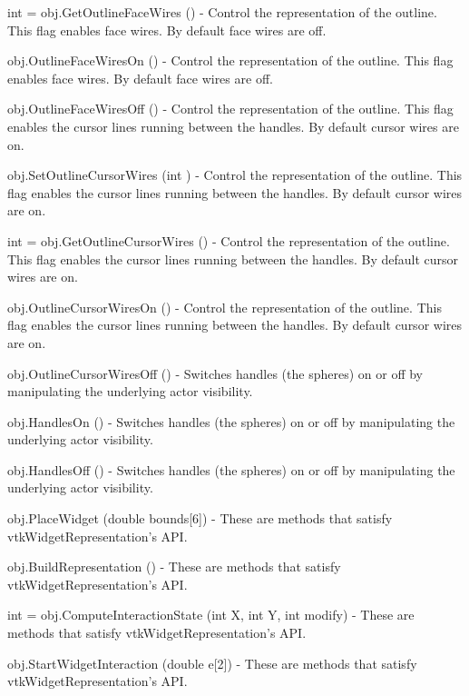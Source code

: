 \begin{DoxyItemize}
\item {\ttfamily int = obj.\-Get\-Outline\-Face\-Wires ()} -\/ Control the representation of the outline. This flag enables face wires. By default face wires are off.  
\item {\ttfamily obj.\-Outline\-Face\-Wires\-On ()} -\/ Control the representation of the outline. This flag enables face wires. By default face wires are off.  
\item {\ttfamily obj.\-Outline\-Face\-Wires\-Off ()} -\/ Control the representation of the outline. This flag enables the cursor lines running between the handles. By default cursor wires are on.  
\item {\ttfamily obj.\-Set\-Outline\-Cursor\-Wires (int )} -\/ Control the representation of the outline. This flag enables the cursor lines running between the handles. By default cursor wires are on.  
\item {\ttfamily int = obj.\-Get\-Outline\-Cursor\-Wires ()} -\/ Control the representation of the outline. This flag enables the cursor lines running between the handles. By default cursor wires are on.  
\item {\ttfamily obj.\-Outline\-Cursor\-Wires\-On ()} -\/ Control the representation of the outline. This flag enables the cursor lines running between the handles. By default cursor wires are on.  
\item {\ttfamily obj.\-Outline\-Cursor\-Wires\-Off ()} -\/ Switches handles (the spheres) on or off by manipulating the underlying actor visibility.  
\item {\ttfamily obj.\-Handles\-On ()} -\/ Switches handles (the spheres) on or off by manipulating the underlying actor visibility.  
\item {\ttfamily obj.\-Handles\-Off ()} -\/ Switches handles (the spheres) on or off by manipulating the underlying actor visibility.  
\item {\ttfamily obj.\-Place\-Widget (double bounds\mbox{[}6\mbox{]})} -\/ These are methods that satisfy vtk\-Widget\-Representation's A\-P\-I.  
\item {\ttfamily obj.\-Build\-Representation ()} -\/ These are methods that satisfy vtk\-Widget\-Representation's A\-P\-I.  
\item {\ttfamily int = obj.\-Compute\-Interaction\-State (int X, int Y, int modify)} -\/ These are methods that satisfy vtk\-Widget\-Representation's A\-P\-I.  
\item {\ttfamily obj.\-Start\-Widget\-Interaction (double e\mbox{[}2\mbox{]})} -\/ These are methods that satisfy vtk\-Widget\-Representation's A\-P\-I.  

\end{DoxyItemize}

